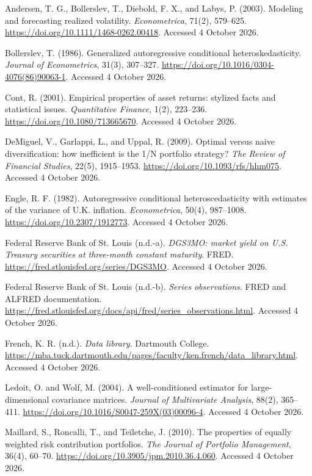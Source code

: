Andersen, T. G., Bollerslev, T., Diebold, F. X., and Labys, P. (2003). Modeling and forecasting realized volatility. \emph{Econometrica}, 71(2), 579--625. \url{https://doi.org/10.1111/1468-0262.00418}. Accessed 4 October 2026.

Bollerslev, T. (1986). Generalized autoregressive conditional heteroskedasticity. \emph{Journal of Econometrics}, 31(3), 307--327. \url{https://doi.org/10.1016/0304-4076(86)90063-1}. Accessed 4 October 2026.

Cont, R. (2001). Empirical properties of asset returns: stylized facts and statistical issues. \emph{Quantitative Finance}, 1(2), 223--236. \url{https://doi.org/10.1080/713665670}. Accessed 4 October 2026.

DeMiguel, V., Garlappi, L., and Uppal, R. (2009). Optimal versus naive diversification: how inefficient is the 1/N portfolio strategy? \emph{The Review of Financial Studies}, 22(5), 1915--1953. \url{https://doi.org/10.1093/rfs/hhm075}. Accessed 4 October 2026.

Engle, R. F. (1982). Autoregressive conditional heteroscedasticity with estimates of the variance of U.K. inflation. \emph{Econometrica}, 50(4), 987--1008. \url{https://doi.org/10.2307/1912773}. Accessed 4 October 2026.

Federal Reserve Bank of St. Louis (n.d.-a). \emph{DGS3MO: market yield on U.S. Treasury securities at three-month constant maturity}. FRED. \url{https://fred.stlouisfed.org/series/DGS3MO}. Accessed 4 October 2026.

Federal Reserve Bank of St. Louis (n.d.-b). \emph{Series observations}. FRED and ALFRED documentation. \url{https://fred.stlouisfed.org/docs/api/fred/series_observations.html}. Accessed 4 October 2026.

French, K. R. (n.d.). \emph{Data library}. Dartmouth College. \url{https://mba.tuck.dartmouth.edu/pages/faculty/ken.french/data_library.html}. Accessed 4 October 2026.

Ledoit, O. and Wolf, M. (2004). A well-conditioned estimator for large-dimensional covariance matrices. \emph{Journal of Multivariate Analysis}, 88(2), 365--411. \url{https://doi.org/10.1016/S0047-259X(03)00096-4}. Accessed 4 October 2026.

Maillard, S., Roncalli, T., and Teïletche, J. (2010). The properties of equally weighted risk contribution portfolios. \emph{The Journal of Portfolio Management}, 36(4), 60--70. \url{https://doi.org/10.3905/jpm.2010.36.4.060}. Accessed 4 October 2026.

